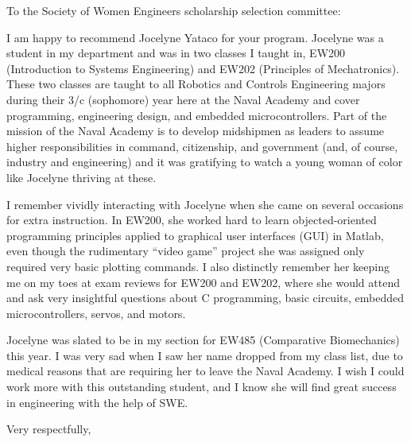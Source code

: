 \documentclass[12pt]{wrceletter}
\date{\today}
\begin{document}
\begin{letter}{%
}

\opening{To the Society of Women Engineers scholarship selection committee:}
\raggedright %
\setlength{\parindent}{15pt} %

I am happy to recommend Jocelyne Yataco for your program. Jocelyne was a student in my department and was in two classes I taught in, EW200 (Introduction to Systems Engineering) and EW202 (Principles of Mechatronics). These two classes are taught to all Robotics and Controls Engineering majors during their 3/c (sophomore) year here at the Naval Academy and cover programming, engineering design, and embedded microcontrollers.  Part of the mission of the Naval Academy is to develop midshipmen as leaders to assume higher responsibilities in command, citizenship, and government (and, of course, industry and engineering) and it was gratifying to watch a young woman of color like Jocelyne thriving at these. 

I remember vividly interacting with Jocelyne when she came on several occasions for extra instruction. In EW200, she worked hard to learn objected-oriented programming principles applied to graphical user interfaces (GUI) in Matlab, even though the rudimentary ``video game'' project she was assigned only required very basic plotting commands. I also distinctly remember her keeping me on my toes at exam reviews for EW200 and EW202, where she would attend and ask very insightful questions about C programming, basic circuits, embedded microcontrollers, servos, and motors. 

Jocelyne was slated to be in my section for EW485 (Comparative Biomechanics) this year. I was very sad when I saw her name dropped from my class list, due to medical reasons that are requiring her to leave the Naval Academy. I wish I could work more with this outstanding student, and I know she will find great success in engineering with the help of SWE. 



\closing{Very respectfully,} %

\end{letter}
\end{document}
